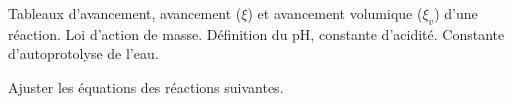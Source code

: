 \begin{prerequis}
Tableaux d'avancement, avancement ($\xi$) et avancement volumique ($\xi_v$) d'une réaction. Loi d'action de masse. Définition du pH, constante d'acidité. Constante d'autoprotolyse de l'eau.
\end{prerequis}














\hauteurLargeurCadreReponse		{8mm}{7.5cm}
\initialisationEntrainement

Ajuster les équations des réactions suivantes.

\debutEntrainement

